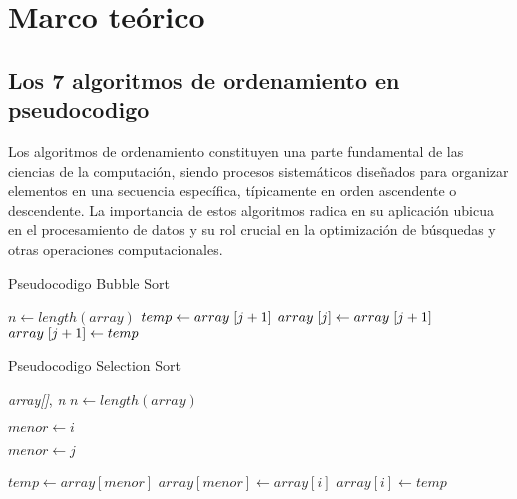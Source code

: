 \newpage
\section{Marco teórico}


\vspace{0.5cm}

\subsection{Los 7 algoritmos de ordenamiento en pseudocodigo}
Los algoritmos de ordenamiento constituyen una parte fundamental de las ciencias de la computación, siendo procesos sistemáticos diseñados para organizar elementos en una secuencia específica, típicamente en orden ascendente o descendente. La importancia de estos algoritmos radica en su aplicación ubicua en el procesamiento de datos y su rol crucial en la optimización de búsquedas y otras operaciones computacionales.

\vspace{2.5cm}

\begin{algorithm}
\caption{Pseudocodigo Bubble Sort}
\label{alg:label}
\begin{algorithmic}
\State $n \gets length(array)$
\State $temp \gets array \hspace{0.1cm}[j + 1]$
\State $array \hspace{0.1cm}[j]\gets array \hspace{0.1cm} [j + 1]$
\State $array \hspace{0.1cm}[j+1]\gets temp$
\EndIf
\EndFor
\EndFor
\EndFunction
\end{algorithmic}
\end{algorithm}
\begin{algorithm}
\caption{Pseudocodigo Selection Sort}
\label{alg:label}
\begin{algorithmic}
{\textit{array[]},\textit{ n}}
\State $n \gets length(array)$

\State $menor \gets i$

\State $menor \gets j$
\EndIf

\EndFor

\EndFor
\State $temp \gets array[menor]$
\State $array[menor] \gets array[i]$
\State $array[i] \gets temp$
\EndFunction
\end{algorithmic}
\end{algorithm}

